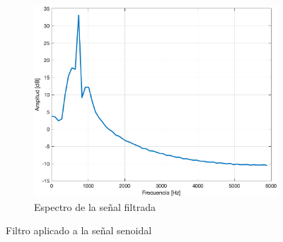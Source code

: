 \documentclass{article}
\begin{document}
\begin{figure}[H]
\begin{subfigure}{.3\textwidth}
    \end{subfigure}
    \hfill
    \begin{subfigure}{.3\textwidth}
        \centering
        \includegraphics[width=\linewidth]{images/V1_Espectro.png}
        \caption{Espectro de la señal filtrada}
        \label{fig:triangular_3}
    \end{subfigure}    
    \caption{Filtro aplicado a la señal senoidal}
    \label{fig:senoidal_filtro}
\end{figure}
\end{document}

